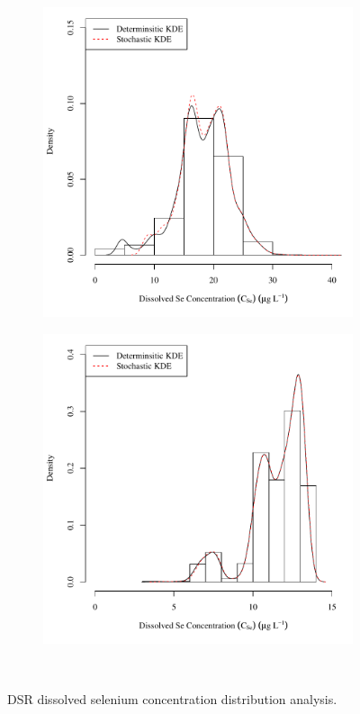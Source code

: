 \subfiguremid
\begin{landscape}
	\begin{figure}
		\begin{subfigure}{0.7\textwidth}
			\centering
			\includegraphics[width=\tableCustomSize]{"Figures/Results_DSR/Stochastic/c d&s est BIG"}
		\end{subfigure}%
		\begin{subfigure}{0.7\textwidth}
			\centering
			\includegraphics[width=\tableCustomSize]{"Figures/Results_DSR/Stochastic/c d&s est BUF"}
		\end{subfigure}\\
		\caption{DSR dissolved selenium concentration distribution analysis.}
	\end{figure}
\end{landscape}

